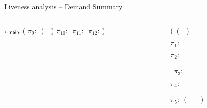\documentclass[xcolor=x11names,compress,mathserif]{beamer}
\renewcommand{\(}{\begin{columns}}
\renewcommand{\)}{\end{columns}}
\newcommand{\<}[1]{\begin{column}{#1}}
\renewcommand{\>}{\end{column}}
\begin{document}
\begin{frame}{Liveness analysis -- Demand Summary}

\small
\begin{columns}[c]
 \begin{column}[T]{0.5\textwidth}
\hspace*{-.3cm}\renewcommand{\arraystretch}{1}{
	  \begin{uprogram}
	  \hspace*{-.2cm} $\pi_{\sf main}\!\!:\, $(\onslide<0>{\LET\  \pz\  $\leftarrow$ \ldots  \IN
	  \UNL{2}   \hspace*{.3cm}              (\LET\ \py\  $\leftarrow$  \ldots \IN}
             \hspace*{-.5cm}    $\pi_9\!\!:\, $  (\append\ \py\ \pz) 
             \hspace*{-.8cm}  $\pi_{10}\!\!:\, $
	     \hspace*{-1.1cm}  $\pi_{11}\!\!:\, $\onslide<0>{(\LET\ \pb\  $\leftarrow$ (\CAR\  \pa) \IN}
             \hspace*{-1.4cm} $\pi_{12}\!\!:\,$)
\end{uprogram}}
 \end{column}
 \begin{column}[T]{0.6\textwidth}
\hspace*{.4cm}  \renewcommand{\arraystretch}{1}{
  \begin{uprogram}
    \hspace*{-.7cm} (\DEFINE\ (\append~\lista~\listb)

    \hspace*{-1cm}  $\pi_1\!\!:\, $


     \hspace*{-1.4cm}     $\pi_2\!\!:\, $

~$\pi_3\!\!:$ 
 
          \hspace*{-1.8cm} \hspace*{.05cm}    
 $\pi_4\!\!:\, $

	  \hspace*{-2.1cm}  \hspace*{.05cm}
          $\pi_5\!\!:\,$ {  (\append\ \ \xtl\ \  \listb)}



\end{uprogram}}
\end{column}
\end{columns}
\end{frame}
\end{document}
